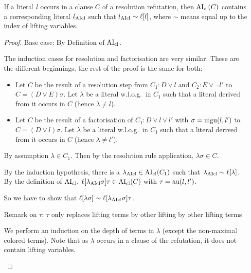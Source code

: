 \documentclass[,%
	paper=a4,%
	DIV14, %
	twoside=false,%
	liststotoc,
	bibtotoc,
	draft=false,%
	numbers=noendperiod
]{scrartcl}
\begin{document}
\begin{lemma} 
	\label{lemma:literal_in_clause_similar}
	If a literal $l$ occurs in a clause $C$ of a resolution refutation,
	then $\operatorname{AI}_\mathrm{cl}(C)$ contains a corresponding literal $l_{\operatorname{AIcl}}$ such that $l_{\operatorname{AIcl}} \sim \ell[l]$, where $\sim$ means equal up to the index of lifting variables.
\end{lemma}
\begin{proof}
	Base case: By Definition of $\operatorname{AI}_\mathrm{cl}$.

	The induction cases for resolution and factorisation are very similar. These are the different beginnings, the rest of the proof is the same for both:

	\begin{itemize}
		\item
			Let $C$ be the result of a resolution step from $C_1: D\lor l$ and $C_2: E\lor \lnot l'$ to $C = (D \lor E)\sigma$.
			Let $\lambda$ be a literal w.l.o.g.\ in $C_1$ such that a literal derived from it occurs in $C$ (hence $\lambda \neq l$). 

		\item
			Let $C$ be the result of a factorisation of $C_1: D \lor l \lor l'$ with $\sigma = \operatorname{mgu}(l, l')$ to $C = (D \lor l)\sigma$. 
			Let $\lambda$ be a literal w.l.o.g.\ in $C_1$ such that a literal derived from it occurs in $C$ (hence $\lambda \neq l'$). 
	\end{itemize}


	By assumption $\lambda \in C_1$. Then by the resolution rule application, $\lambda\sigma \in C$.

	\newcommand{\lclOne}{\lambda\cl}
	By the induction hypothesis, there is a $\lclOne \in \AIclause(C_1)$ such that $\lclOne \sim \lifboth{\lambda}$.
	By the definition of $\operatorname{AI}_\mathrm{cl}$, $\lifboth{\lclOne\sigma}\tau \in \AIclause(C)$ 
	with $\tau = \operatorname{au}(l, l')$.

	So we have to show that $\ell[ \lambda \sigma ]  \sim \ell[\lambda_{\operatorname{AIcl}}\sigma]\tau$.

	Remark on $\tau$: $\tau$ only replaces lifting terms by other lifting by other lifting terms

	We perform an induction on the depth of terms in $\lambda$ (except the non-maximal colored terms). Note that as $\lambda$ occurs in a clause of the refutation, it does not contain lifting variables.
	\begin{itemize}
			\begin{comment} NO LIFTING VARS!
			\item Suppose $t$ is a term of size $1$ in $\lambda$ and it is a lifting variable, say $z_i$.
				Then by Lemma~\ref{lemma:no_lifting_vars_in_subst}, $t\sigma = t$ and also $\lifboth{t\sigma} = t$.


\end{comment}
\end{itemize}
\end{proof}
\end{document}
